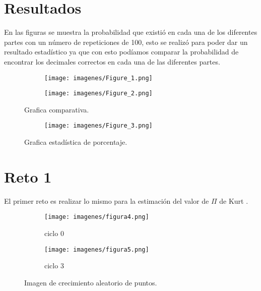 \documentclass{article}
\begin{document}
\section{Resultados}
En las figuras se muestra la probabilidad que existió en cada una de los diferentes partes con un número de repeticiones de 100, esto se realizó para poder dar un resultado estadístico ya que con esto podíamos comparar la probabilidad de encontrar los decimales correctos en cada una de las diferentes partes.

\begin{figure}[H]
\centering
\begin{subfigure}[Absoluto]{0.40\linewidth}
\texttt{[image: imagenes/Figure\_1.png]}
\caption{}
\end{subfigure}
\begin{subfigure}[Cuadrado]{0.40\linewidth}
\texttt{[image: imagenes/Figure\_2.png]}
\caption{}
\end{subfigure}
\caption{Grafica comparativa.}
\label{fig:westminster}
\end{figure}

\begin{figure}[H]
\centering
\begin{subfigure}[b]{0.50\linewidth}
\texttt{[image: imagenes/Figure\_3.png]}
\caption{}
\end{subfigure}
\caption{Grafica estadística de porcentaje.}
\label{fig:westminster}
\end{figure}


\section{Reto 1}
El primer reto es realizar lo mismo para la estimación del valor de $ \Pi$   de  Kurt  \citep{kurt}.

 \begin{figure}[H]
\centering
\begin{subfigure}[Puntos dentro del circulo]{0.40\linewidth}
\texttt{[image: imagenes/figura4.png]}
\caption{ciclo 0}
\end{subfigure}
\begin{subfigure}[Puntos fuera del circulo]{0.40\linewidth}
\texttt{[image: imagenes/figura5.png]}
\caption{ciclo 3}
\end{subfigure}
\caption{Imagen de crecimiento aleatorio de puntos.}
\label{fig:westminster}
\end{figure}
\end{document}
